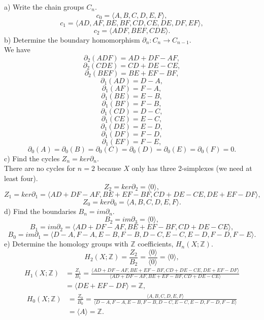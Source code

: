 \documentclass[a4paper,11pt]{article}
\begin{document}
\noindent
a) Write the chain groups $C_n$.
\\
$$ 
c_0 = \langle A, B, C, D, E, F \rangle,
$$
$$
c_1 = \langle AD, AF, BE, BF, CD, CE, DE, DF, EF \rangle,
$$
$$
c_2 = \langle ADF, BEF, CDE \rangle.
$$
b) Determine the boundary homomorphism $\partial_n : C_n \rightarrow C_{n - 1}$.
\\
We have
$$
\partial_2(ADF) = AD + DF - AF,
$$
$$
\partial_2(CDE) = CD + DE - CE,
$$
$$
\partial_2(BEF) = BE + EF - BF,
$$
$$
\partial_1(AD) = D - A,
$$
$$
\partial_1(AF) = F - A,
$$
$$
\partial_1(BE) = E - B,
$$
$$
\partial_1(BF) = F - B,
$$
$$
\partial_1(CD) = D - C,
$$
$$
\partial_1(CE) = E - C,
$$
$$
\partial_1(DE) = E - D,
$$
$$
\partial_1(DF) = F - D,
$$
$$
\partial_1(EF) = F - E,
$$
$$
\partial_0(A) = \partial_0(B) = \partial_0(C) = \partial_0(D) = \partial_0(E) = \partial_0(F) = 0.
$$
c) Find the cycles $Z_n = ker \partial_n.$
\\
There are no cycles for $ n = 2 $ because $X$ only has three 2-simplexes (we need at least four).
$$
Z_2 = ker \partial_2 = \langle 0 \rangle,
$$
$$
Z_1 = ker \partial_1 = \langle AD + DF - AF, BE + EF - BF, CD + DE - CE, DE + EF - DF \rangle,
$$
$$
Z_0 = ker \partial_0 = \langle A, B, C, D, E, F \rangle.
$$
d) Find the boundaries $B_n = im \partial_n$.
$$
B_2 = im \partial_3 = \langle 0 \rangle,
$$
$$
B_1 = im \partial_2 = \langle AD + DF - AF, BE + EF - BF, CD + DE - CE \rangle,
$$
$$
B_0 = im \partial_1 = \langle D - A, F - A, E - B, F - B, D - C, E - C, E - D, F - D, F - E \rangle.
$$
e) Determine the homology groups with $\mathbb{Z}$ coefficients, $H_n(X;\mathbb{Z})$.
$$
H_2(X;\mathbb{Z}) = \frac{Z_2}{B_2} = \frac{\langle 0 \rangle}{\langle 0 \rangle} = \langle 0 \rangle,
$$
\begin{align*}
H_1(X;\mathbb{Z}) &= \frac{Z_1}{B_1} = \frac{\langle AD + DF - AF, BE + EF - BF, CD + DE - CE, DE + EF - DF \rangle}{\langle AD + DF - AF, BE + EF - BF, CD + DE - CE \rangle} 
\\
&= \langle DE + EF - DF \rangle = \mathbb{Z},
\end{align*}
\begin{align*}
H_0(X;\mathbb{Z}) &= \frac{Z_0}{B_0} = \frac{\langle A, B, C, D, E, F \rangle}{\langle D - A, F - A, E - B, F - B, D - C, E - C, E - D, F - D, F - E \rangle} 
\\
&= \langle A \rangle = \mathbb{Z}.
\end{align*}
\end{document}
